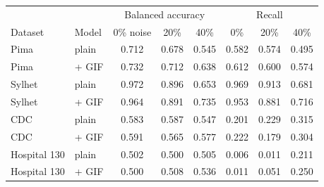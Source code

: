 ﻿\begin{tabular}{llcccccc}
\toprule & & \multicolumn{3}{c}{Balanced accuracy} & \multicolumn{3}{c}{Recall}\\
Dataset & Model & 0\% noise & 20\% & 40\% & 0\% & 20\% & 40\%\\\midrule
Pima & plain & 0.712 & 0.678 & 0.545 & 0.582 & 0.574 & 0.495\\
Pima & + GIF & 0.732 & 0.712 & 0.638 & 0.612 & 0.600 & 0.574\\
\midrule
Sylhet & plain & 0.972 & 0.896 & 0.653 & 0.969 & 0.913 & 0.681\\
Sylhet & + GIF & 0.964 & 0.891 & 0.735 & 0.953 & 0.881 & 0.716\\
\midrule
CDC & plain & 0.583 & 0.587 & 0.547 & 0.201 & 0.229 & 0.315\\
CDC & + GIF & 0.591 & 0.565 & 0.577 & 0.222 & 0.179 & 0.304\\
\midrule
Hospital 130 & plain & 0.502 & 0.500 & 0.505 & 0.006 & 0.011 & 0.211\\
Hospital 130 & + GIF & 0.500 & 0.508 & 0.536 & 0.011 & 0.051 & 0.250\\
\bottomrule\end{tabular}

